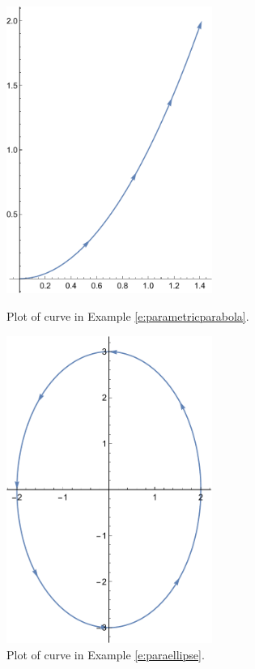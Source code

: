 \documentclass[letterpaper, 11pt, openany]{book}
\theoremstyle{mytheoremstyle}
\theoremstyle{myexamplestyle}
\begin{document}
\begin{figure}[htbp]
    \centering
    \begin{minipage}{0.45\textwidth}
        \centering
        \includegraphics[width=0.6\textwidth]{Figures/parapara.pdf}
        \caption{Plot of curve in Example \ref{e:parametricparabola}.}
        \label{f:parapara}
    \end{minipage}\hfill
    \begin{minipage}{0.45\textwidth}
        \centering
        \includegraphics[width=0.6\textwidth]{Figures/paraellipse.pdf}
        \caption{Plot of curve in Example \ref{e:paraellipse}.}
        \label{f:paraellipse}
    \end{minipage}\hfill
\end{figure}
\end{document}
